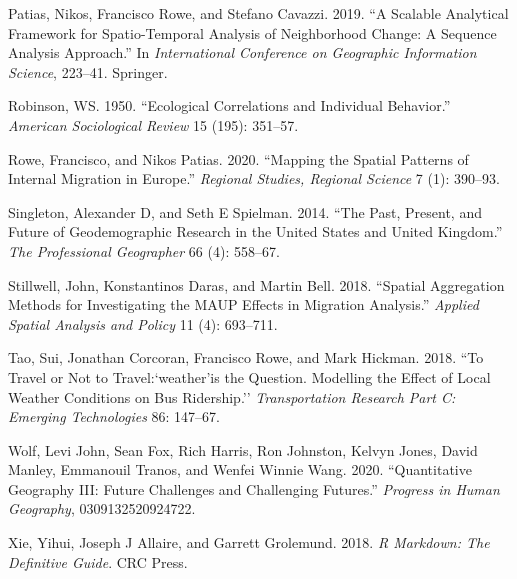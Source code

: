 \documentclass[
  letterpaper,
  krantz2]{style/krantz}
\newlength{\cslhangindent}
\newlength{\cslentryspacingunit} %
\newenvironment{CSLReferences}[2] %
 {%
  \setlength{\parindent}{0pt}
  \ifodd #1
  \let\oldpar\par
  \def\par{\hangindent=\cslhangindent\oldpar}
  \fi
  \setlength{\parskip}{#2\cslentryspacingunit}
 }%
 {}
\begin{document}
\begin{CSLReferences}{1}{0}
\leavevmode{}%
Patias, Nikos, Francisco Rowe, and Stefano Cavazzi. 2019. {``A Scalable
Analytical Framework for Spatio-Temporal Analysis of Neighborhood
Change: A Sequence Analysis Approach.''} In \emph{International
Conference on Geographic Information Science}, 223--41. Springer.

\leavevmode{}%
Robinson, WS. 1950. {``Ecological Correlations and Individual
Behavior.''} \emph{American Sociological Review} 15 (195): 351--57.

\leavevmode{}%
Rowe, Francisco, and Nikos Patias. 2020. {``Mapping the Spatial Patterns
of Internal Migration in Europe.''} \emph{Regional Studies, Regional
Science} 7 (1): 390--93.

\leavevmode{}%
Singleton, Alexander D, and Seth E Spielman. 2014. {``The Past, Present,
and Future of Geodemographic Research in the United States and United
Kingdom.''} \emph{The Professional Geographer} 66 (4): 558--67.

\leavevmode{}%
Stillwell, John, Konstantinos Daras, and Martin Bell. 2018. {``Spatial
Aggregation Methods for Investigating the MAUP Effects in Migration
Analysis.''} \emph{Applied Spatial Analysis and Policy} 11 (4):
693--711.

\leavevmode{}%
Tao, Sui, Jonathan Corcoran, Francisco Rowe, and Mark Hickman. 2018.
{``To Travel or Not to Travel:`weather'is the Question. Modelling the
Effect of Local Weather Conditions on Bus Ridership.''}
\emph{Transportation Research Part C: Emerging Technologies} 86:
147--67.

\leavevmode{}%
Wolf, Levi John, Sean Fox, Rich Harris, Ron Johnston, Kelvyn Jones,
David Manley, Emmanouil Tranos, and Wenfei Winnie Wang. 2020.
{``Quantitative Geography III: Future Challenges and Challenging
Futures.''} \emph{Progress in Human Geography}, 0309132520924722.

\leavevmode{}%
Xie, Yihui, Joseph J Allaire, and Garrett Grolemund. 2018. \emph{R
Markdown: The Definitive Guide}. CRC Press.

\end{CSLReferences}



\printindex
\end{document}
